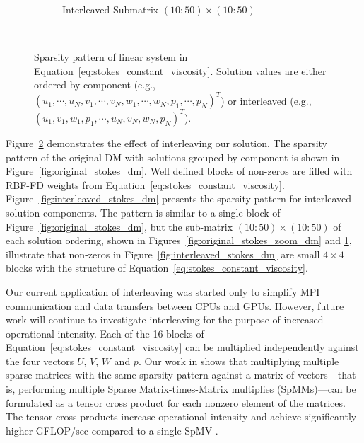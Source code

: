 \begin{figure}[ht]
\begin{subfigure}[b]{0.4\textwidth}
		\caption{Interleaved Submatrix $(10:50) \times (10:50)$}
		\label{fig:interleaved_stokes_zoom_dm}
	\end{subfigure} \\
\caption{Sparsity pattern of linear system in Equation~\ref{eq:stokes_constant_viscosity}. Solution values are either ordered by component (e.g., $( u_1, \cdots, u_N, v_1, \cdots, v_N, w_1, \cdots, w_N, p_1, \cdots, p_N)^T$) or interleaved (e.g., $( u_1, v_1, w_1, p_1,\cdots, u_N, v_N, w_N, p_N)^T$). }
\label{fig:interleaved_solution}
\end{figure} 

Figure~\ref{fig:interleaved_solution} demonstrates the effect of interleaving our solution. The sparsity pattern of the original DM with solutions grouped by component is shown in Figure~\ref{fig:original_stokes_dm}. Well defined blocks of non-zeros are filled with RBF-FD weights from Equation~\ref{eq:stokes_constant_viscosity}. Figure~\ref{fig:interleaved_stokes_dm} presents the sparsity pattern for interleaved solution components. The pattern is similar to a single block of Figure~\ref{fig:original_stokes_dm}, but the sub-matrix $(10:50)\times(10:50)$ of each solution ordering, shown in Figures~\ref{fig:original_stokes_zoom_dm} and \ref{fig:interleaved_stokes_zoom_dm}, illustrate that non-zeros in Figure~\ref{fig:interleaved_stokes_dm} are small $4\times4$ blocks with the structure of Equation~\ref{eq:stokes_constant_viscosity}.

Our current application of interleaving was started only to simplify MPI communication and data transfers between CPUs and GPUs. However, future work will continue to investigate interleaving for the purpose of increased operational intensity. Each of the 16 blocks of Equation~\ref{eq:stokes_constant_viscosity} can be multiplied independently against the four vectors $U$, $V$, $W$ and $p$. Our work in \cite{ErlebacherSauleFlyerBollig2013} shows that multiplying multiple sparse matrices with the same sparsity pattern against a matrix of vectors---that is, performing multiple Sparse Matrix-times-Matrix multiplies (SpMMs)---can be formulated as a tensor cross product for each nonzero element of the matrices. The tensor cross products increase operational intensity and achieve significantly higher GFLOP/sec compared to a single SpMV \cite{ErlebacherSauleFlyerBollig2013}. %




